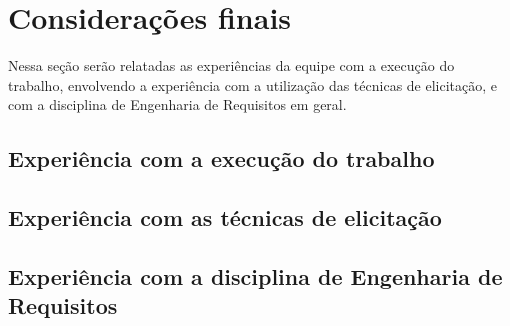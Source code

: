 \chapter[Considerações finais]{Considerações finais}
    
  Nessa seção serão relatadas as experiências da equipe com a execução do trabalho, envolvendo a experiência com 
  a utilização das técnicas de elicitação, e com a disciplina de Engenharia de Requisitos em geral.
  
  \section{Experiência com a execução do trabalho}
  
  
  \section{Experiência com as técnicas de elicitação}
  
  
  \section{Experiência com a disciplina de Engenharia de Requisitos}
    
